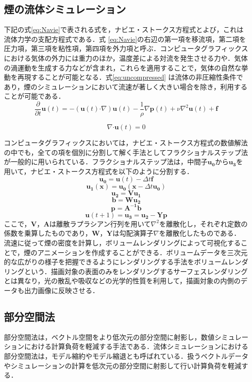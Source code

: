 \documentclass[uplatex,dvipdfmx,10pt,a4paper,notitlepage,oneside,twocolumn]{abst_jsarticle}
\begin{document}
\subsection{煙の流体シミュレーション}
下記の式\ref{eq:Navie}で表される式を，ナビエ・ストークス方程式とよび，これは流体力学の支配方程式である．式 \ref{eq:Navie}の右辺の第一項を移流項，第二項を圧力項，第三項を粘性項，第四項を外力項と呼ぶ．コンピュータグラフィックスにおける気体の外力には重力のほか，温度差による対流を発生させる力や．気体の渦運動を生成する力などが含まれ，これらを適用することで，気体の自然な挙動を再現することが可能となる．式\ref{eq:uncompressed} は流体の非圧縮性条件であり，煙のシミュレーションにおいて流速が著しく大きい場合を除き，利用することが可能である．
	\begin{equation}\label{eq:Navie}
		\frac{\partial}{\partial t}\bm{u} (t)  = - (\bm{u} (t)  \boldsymbol{\cdot}\nabla) \bm{u} (t)   - \frac{1}{\rho}\nabla \bm{p} (t)  + \nu\nabla^2\bm{u} (t)  + \bm{f}
	\end{equation}
	
	\begin{equation}\label{eq:uncompressed}
		\nabla\boldsymbol{\cdot}\bm{u} (t)  = 0
	\end{equation}
	
コンピュータグラフィックスにおいては，ナビエ・ストークス方程式の数値解法の中でも，全ての項を個別に分割して解く手法としてフラクショナルステップ法 \cite{Chorin}が一般的に用いられている．フラクショナルステップ法は，中間子$\bm{u_0}$から$\bm{u_3}$を用いて，ナビエ・ストークス方程式を以下のように分割する．
\[
	\bm{u_0} =  \bm{u} (t)  - \varDelta t \bm{f} 	
\]
\[
	\bm{u_1}(\bm{x}) = \bm{u_0}(\bm{x}  - \varDelta t \bm{u_0})
\]
\[
	\bm{u_2}   =  \bm{V}\bm{u_1}
\]
\[
	\bm{b} = \bm{W}\bm{u_2}
\]
\[
	\bm{p} = \bm{A^{-1}}\bm{b}
\]
\[
	\bm{u} (t+1) = \bm{u_3}  =  \bm{u_2} - \bm{Y}\bm{p} 
\]
ここで，$\bm{V}$，$\bm{A}$は離散ラプラシアン行列を用いて$\nabla^2$を離散化し，それぞれ定数の係数を乗算したものであり，$\bm{W}$，$\bm{Y}$は勾配演算子$\nabla$を離散化したものである．
流速に従って煙の密度を計算し，ボリュームレンダリングによって可視化することで，煙のアニメーションを作成することができる．ボリュームデータを三次元的な広がりの様子を把握できるようにレンダリングする手法をボリュームレンダリングという．描画対象の表面のみをレンダリングするサーフェスレンダリングとは異なり，光の散乱や吸収などの光学的性質を利用して，描画対象の内側のデータも出力画像に反映させる．
\subsection{部分空間法}
部分空間法は，ベクトル空間をより低次元の部分空間に射影し，数値シミュレーションにおける計算負荷を軽減する手法である．流体シミュレーションにおける部分空間法は，モデル縮約やモデル縮退とも呼ばれている．扱うベクトルデータやシミュレーションの計算を低次元の部分空間に射影して行い計算負荷を軽減する．
\end{document}
